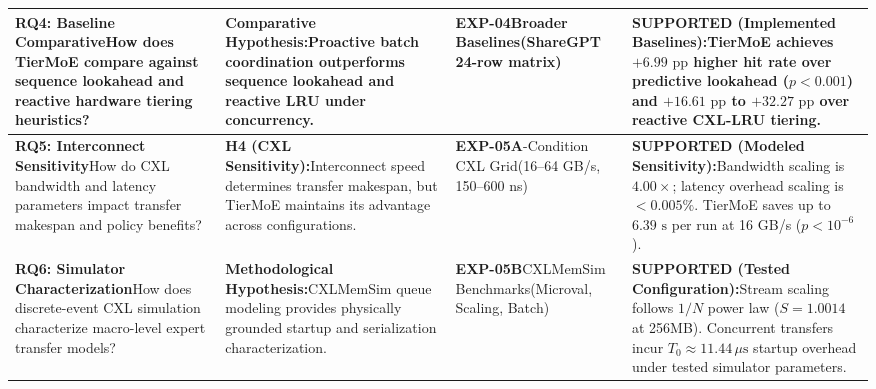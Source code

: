 \documentclass[10pt,journal,compsoc]{IEEEtran}
\begin{document}
\begin{table}[t]
\begin{tabular}{@{}p{3.8cm}p{5.5cm}p{2.2cm}p{5.0cm}@{}}
\midrule
\textbf{RQ4: Baseline Comparative}\newline How does TierMoE compare against sequence lookahead and reactive hardware tiering heuristics? & \textbf{Comparative Hypothesis:}\newline Proactive batch coordination outperforms sequence lookahead and reactive LRU under concurrency. & \textbf{EXP-04}\newline Broader Baselines\newline (ShareGPT 24-row matrix) & \textbf{SUPPORTED (Implemented Baselines):}\newline TierMoE achieves $+6.99\text{ pp}$ higher hit rate over predictive lookahead ($p < 0.001$) and $+16.61\text{ pp}$ to $+32.27\text{ pp}$ over reactive CXL-LRU tiering. \\
\midrule
\textbf{RQ5: Interconnect Sensitivity}\newline How do CXL bandwidth and latency parameters impact transfer makespan and policy benefits? & \textbf{H4 (CXL Sensitivity):}\newline Interconnect speed determines transfer makespan, but TierMoE maintains its advantage across configurations. & \textbf{EXP-05A}\newline 81-Condition CXL Grid\newline (16--64 GB/s, 150--600 ns) & \textbf{SUPPORTED (Modeled Sensitivity):}\newline Bandwidth scaling is $4.00\times$; latency overhead scaling is $< 0.005\%$. TierMoE saves up to $6.39\text{ s}$ per run at 16 GB/s ($p < 10^{-6}$). \\
\midrule
\textbf{RQ6: Simulator Characterization}\newline How does discrete-event CXL simulation characterize macro-level expert transfer models? & \textbf{Methodological Hypothesis:}\newline CXLMemSim queue modeling provides physically grounded startup and serialization characterization. & \textbf{EXP-05B}\newline CXLMemSim Benchmarks\newline (Microval, Scaling, Batch) & \textbf{SUPPORTED (Tested Configuration):}\newline Stream scaling follows $1/N$ power law ($S = 1.0014$ at 256MB). Concurrent transfers incur $T_0 \approx 11.44\,\mu\text{s}$ startup overhead under tested simulator parameters. \\
\bottomrule
\end{tabular}
\end{table}
\end{document}
